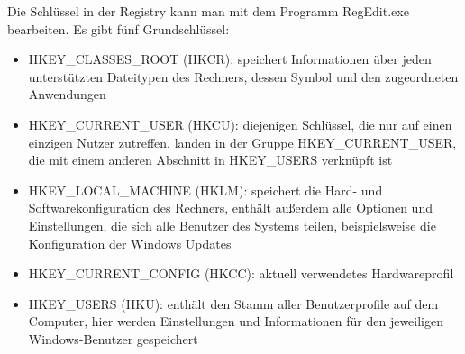 Die Schlüssel in der Registry kann man mit dem Programm RegEdit.exe bearbeiten. Es gibt fünf Grundschlüssel:
\begin{itemize}
	\item HKEY_CLASSES_ROOT (HKCR): speichert Informationen über jeden unterstützten Dateitypen des Rechners, dessen Symbol und den zugeordneten Anwendungen
	\item HKEY_CURRENT_USER (HKCU): diejenigen Schlüssel, die nur auf einen einzigen Nutzer zutreffen, landen in der Gruppe HKEY_CURRENT_USER, die mit einem anderen Abschnitt in HKEY_USERS verknüpft ist
	\item HKEY_LOCAL_MACHINE (HKLM): speichert die Hard- und Softwarekonfiguration des Rechners, enthält außerdem alle Optionen und Einstellungen, die sich alle Benutzer des Systems teilen, beispielsweise die Konfiguration der Windows Updates
	\item HKEY_CURRENT_CONFIG (HKCC): aktuell verwendetes Hardwareprofil
	\item HKEY_USERS (HKU): enthält den Stamm aller Benutzerprofile auf dem Computer, hier werden Einstellungen und Informationen für den jeweiligen Windows-Benutzer gespeichert
\end{itemize}







